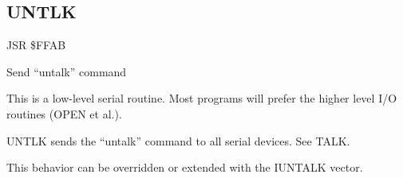 
\newpage
\subsection{UNTLK}
\label{KERNAL Jump Table!UNTLK}
\begin{description}[leftmargin=2cm,style=nextline]
    \item [Address:] JSR \$FFAB
    \item [Description:] Send ``untalk'' command
    \item [Remarks:]
        This is a low-level serial routine. Most programs will prefer the higher level I/O routines (OPEN et al.).

        UNTLK sends the ``untalk'' command to all serial devices. See TALK.

        This behavior can be overridden or extended with the IUNTALK vector.
    \item [Example:]
\end{description}



\newpage
